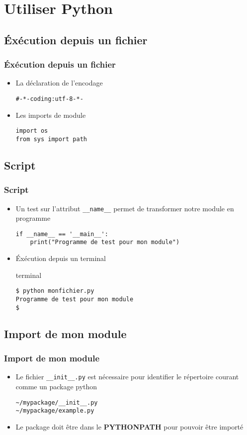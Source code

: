 \section{Utiliser Python}

\subsection{Éxécution depuis un fichier}
\begin{frame}[fragile]
  \frametitle{Éxécution depuis un fichier}
  \begin{itemize}
  \item La déclaration de l'encodage
  \begin{lstlisting}
#-*-coding:utf-8-*-
  \end{lstlisting}
  \pause
  \item Les imports de module
  \begin{lstlisting}
import os
from sys import path
  \end{lstlisting}
  \end{itemize}
\end{frame}

\subsection{Script}
\begin{frame}[fragile]
  \frametitle{Script}
  \begin{itemize}
  \item Un test sur l'attribut \verb=__name__=  permet de transformer notre module en programme
  \begin{lstlisting}
if __name__ == '__main__':
    print("Programme de test pour mon module")
  \end{lstlisting}
  \pause
  \item Éxécution depuis un terminal
  \begin{beamercolorbox}{terminal}
\scriptsize\begin{verbatim}$ python monfichier.py
Programme de test pour mon module
$
\end{verbatim}
\end{beamercolorbox}
\end{itemize}
\end{frame}

\subsection{Import de mon module}
\begin{frame}[fragile]
  \frametitle{Import de mon module}
    \begin{itemize}
      \item Le fichier \verb=__init__.py= est nécessaire pour identifier le répertoire courant comme un package python
      \begin{lstlisting}
~/mypackage/__init__.py
~/mypackage/example.py
      \end{lstlisting}
      \pause
      \item Le package doit être dans le {\bf PYTHONPATH} pour pouvoir être importé
    \end{itemize}
\end{frame}

